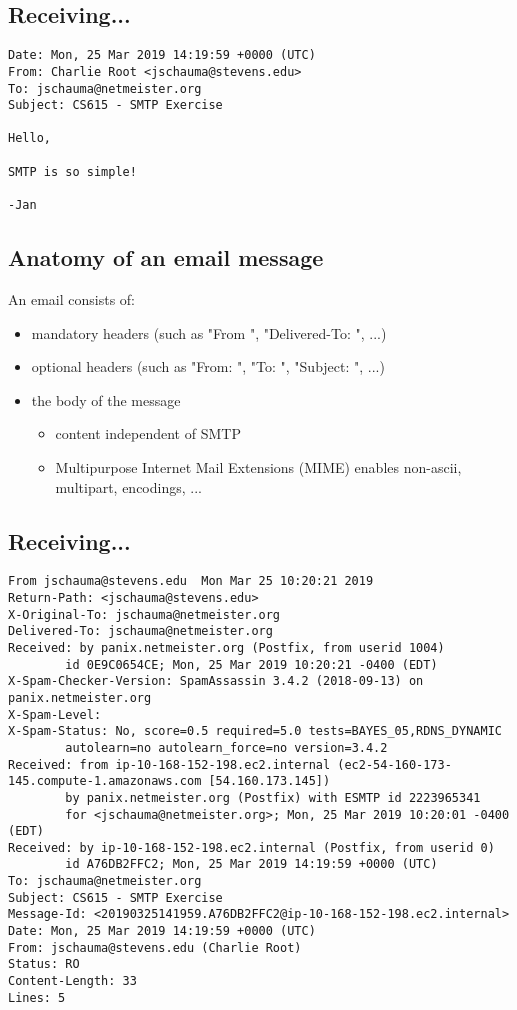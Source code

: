 \documentclass[xga]{xdvislides}
\begin{document}
\subsection{Receiving...}
\begin{verbatim}
Date: Mon, 25 Mar 2019 14:19:59 +0000 (UTC)                                                         
From: Charlie Root <jschauma@stevens.edu>                                                           
To: jschauma@netmeister.org                                                                         
Subject: CS615 - SMTP Exercise                                                                      

Hello,

SMTP is so simple!

-Jan
\end{verbatim}

\subsection{Anatomy of an email message}
An email consists of:
\begin{itemize}
	\item mandatory headers (such as "From ", "Delivered-To: ", ...)
	\item optional headers (such as "From: ", "To: ", "Subject: ", ...)
	\item the body of the message
	\begin{itemize}
		\item content independent of SMTP
		\item Multipurpose Internet Mail Extensions (MIME) enables non-ascii, multipart, encodings, ...
	\end{itemize}
\end{itemize}


\subsection{Receiving...}
\smallish
\begin{verbatim}
From jschauma@stevens.edu  Mon Mar 25 10:20:21 2019
Return-Path: <jschauma@stevens.edu>
X-Original-To: jschauma@netmeister.org
Delivered-To: jschauma@netmeister.org
Received: by panix.netmeister.org (Postfix, from userid 1004)
        id 0E9C0654CE; Mon, 25 Mar 2019 10:20:21 -0400 (EDT)
X-Spam-Checker-Version: SpamAssassin 3.4.2 (2018-09-13) on panix.netmeister.org
X-Spam-Level: 
X-Spam-Status: No, score=0.5 required=5.0 tests=BAYES_05,RDNS_DYNAMIC
        autolearn=no autolearn_force=no version=3.4.2
Received: from ip-10-168-152-198.ec2.internal (ec2-54-160-173-145.compute-1.amazonaws.com [54.160.173.145])
        by panix.netmeister.org (Postfix) with ESMTP id 2223965341
        for <jschauma@netmeister.org>; Mon, 25 Mar 2019 10:20:01 -0400 (EDT)
Received: by ip-10-168-152-198.ec2.internal (Postfix, from userid 0)
        id A76DB2FFC2; Mon, 25 Mar 2019 14:19:59 +0000 (UTC)
To: jschauma@netmeister.org
Subject: CS615 - SMTP Exercise
Message-Id: <20190325141959.A76DB2FFC2@ip-10-168-152-198.ec2.internal>
Date: Mon, 25 Mar 2019 14:19:59 +0000 (UTC)
From: jschauma@stevens.edu (Charlie Root)
Status: RO
Content-Length: 33
Lines: 5
\end{verbatim}
\Normalsize
\end{document}
